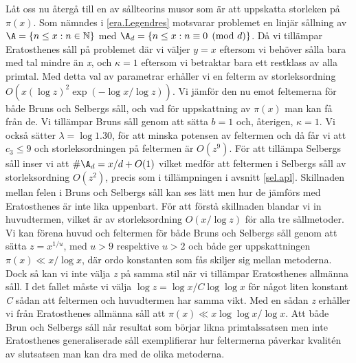 Låt oss nu återgå till en av sållteorins musor som är att uppskatta storleken på \(\pi(x)\).
Som nämndes i \ref{era.Legendres} motsvarar problemet en linjär sållning av \(\A = \{n\leq x: n\in\mathbb{N}\}\) med \(\A_d = \{n\leq x: n \equiv 0 \pmod{d}\}\). Då vi tillämpar Eratosthenes såll på problemet där vi väljer \(y = x\) eftersom vi behöver sålla bara med tal mindre än \textit{x}, och \(\kappa = 1\) eftersom vi betraktar bara ett restklass av alla primtal. 
Med detta val av parametrar erhåller vi en felterm av storleksordning \(O(x(\log z)^2\exp({-\log x/\log z}))\).
Vi jämför den nu emot feltemerna för både Bruns och Selbergs såll, och vad för uppskattning av \(\pi(x)\) man kan få  från de.
Vi tillämpar Bruns såll genom att sätta \(b = 1\) och, återigen, \(\kappa = 1\). 
Vi också sätter \(\lambda = \log 1.30\), för att minska potensen av feltermen och då får vi att \(c_3 \leq 9\) och storleksordningen på feltermen är \(O(z^9)\).
För att tillämpa Selbergs såll inser vi att \(\#\A_d = x/d + O(1)\) vilket medför att feltermen i Selbergs såll av storleksordning \(O(z^2)\), precis som i tillämpningen i avsnitt \ref{sel.apl}.
Skillnaden mellan felen i Bruns och Selbergs såll kan ses lätt men hur de jämförs med Eratosthenes är inte lika uppenbart.
För att förstå skillnaden blandar vi in huvudtermen, vilket är av storleksordning \(O(x/\log z)\) för alla tre sållmetoder.
Vi kan förena huvud och feltermen för både Bruns och Selbergs såll genom att sätta \(z = x^{1/u}\), med \(u > 9\) respektive \(u > 2\) och både ger uppskattningen \(\pi(x) \ll x/\log x\), där ordo konstanten som fås skiljer sig mellan metoderna. 
Dock så kan vi inte välja \textit{z} på samma stil när vi tillämpar Eratosthenes allmänna såll.
I det fallet måste vi välja \(\log z = \log x/C\log\log x\) för något liten konstant \textit{C} sådan att feltermen och huvudtermen har samma vikt.
Med en sådan \textit{z} erhåller vi från Eratosthenes allmänna såll att \(\pi(x) \ll x\log\log x/\log x\).
Att både Brun och Selbergs såll når resultat som börjar likna primtalssatsen men inte Eratosthenes generaliserade såll  exemplifierar hur feltermerna påverkar kvalitén av slutsatsen man kan dra med de olika metoderna.


